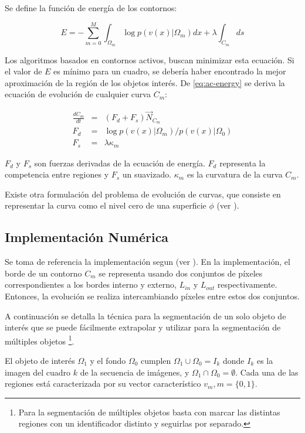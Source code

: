 Se define la función de energía de los contornos:

\begin{equation}
    \label{eq:ac-energy}
    E = - \sum_{m=0}^{M}{\int_{\Omega_m}{\log{p(v(x) \vert \Omega_m)} dx} + \lambda \int_{C_m}{ds}}
\end{equation}

Los algoritmos basados en contornos activos, buscan minimizar esta ecuación. Si el valor de $E$ es mínimo para un cuadro, se
debería haber encontrado la mejor aproximación de la región de los objetos interés. De \ref{eq:ac-energy} se
deriva la ecuación de evolución de cualquier curva $C_m$:

\begin{eqnarray}
    \frac{dC_m}{dt} &=& (F_d + F_s) \overrightarrow{N}_{C_m} \\
    F_d &=& \log{p(v(x) \vert \Omega_m) / p(v(x) \vert \Omega_0)} \\
    F_s &=& \lambda \kappa_m \label{eq:ac-formal}
\end{eqnarray}

$F_d$ y $F_s$ son fuerzas derivadas de la ecuación de energía. $F_d$ representa la competencia entre regiones y $F_s$ un
suavizado. $\kappa_m$ es la curvatura de la curva $C_m$.

Existe otra formulación del problema de evolución de curvas, que consiste en
representar la curva como el nivel cero de una superficie $\phi$ (ver \cite{Osher88}).

\subsection{Implementación Numérica}

Se toma de referencia la implementación segun \citeauthor{fast-level-set} (ver \cite{fast-level-set}).
En la implementación, el borde de un contorno $C_m$ se representa usando dos conjuntos de píxeles
correspondientes a los bordes interno y externo, $L_{in}$ y $L_{out}$
respectivamente. Entonces, la evolución se realiza intercambiando píxeles entre
estos dos conjuntos.

A continuación se detalla la técnica para la segmentación de un solo objeto de
interés que se puede fácilmente extrapolar y utilizar para la
segmentación de múltiples objetos
\footnote{Para la segmentación de múltiples objetos basta con marcar las distintas regiones con un identificador
distinto y seguirlas por separado.}.

El objeto de interés $\Omega_{1}$ y el fondo $\Omega_{0}$ cumplen
$\Omega_{1}\cup\Omega_{0} = I_{k}$ donde $I_{k}$ es la imagen del cuadro $k$ de
la secuencia de imágenes, y $\Omega_{1}\cap\Omega_{0} = \emptyset$. Cada una de
las regiones está caracterizada por su vector característico $v_{m}, m =
\{0,1\}$.

